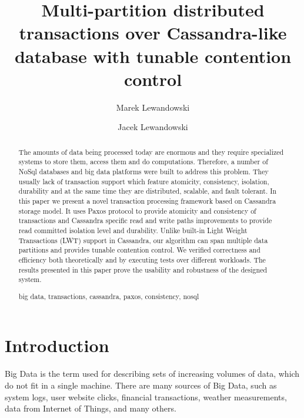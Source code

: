 \documentclass[runningheads,a4paper]{llncs}
\newcommand{\keywords}[1]{\par\addvspace\baselineskip
\noindent\keywordname\enspace\ignorespaces#1}
\begin{document}
\mainmatter

\title{Multi-partition distributed transactions over Cassandra-like database with tunable contention control}

\author{Marek Lewandowski \and Jacek Lewandowski}


\maketitle

\begin{abstract} The amounts of data being processed today are enormous and they
require specialized systems  to store them, access them and do computations.
Therefore, a number of NoSql databases and  big data platforms were built to
address this problem. They usually lack of transaction  support which feature
atomicity, consistency, isolation, durability and at the same time  they are
distributed, scalable, and fault tolerant. In this paper we present a novel
transaction processing framework based on Cassandra storage model. It uses Paxos
protocol  to provide atomicity and consistency of transactions and Cassandra
specific read and write  paths improvements to provide read committed isolation
level and durability. Unlike built-in  Light Weight Transactions (LWT) support
in Cassandra, our algorithm can span multiple data  partitions and provides
tunable contention control. We verified correctness and efficiency  both
theoretically and by executing tests over different workloads. The results
presented  in this paper prove the usability and robustness of the designed
system.  \keywords{big data, transactions, cassandra, paxos, consistency, nosql}
\end{abstract}

\section{Introduction} Big Data is the term used for describing sets of
increasing volumes of data, which do not fit  in a single machine. There are
many sources of Big Data, such as system logs, user website  clicks, financial
transactions, weather measurements, data from Internet of Things, and many
others.
\end{document}
